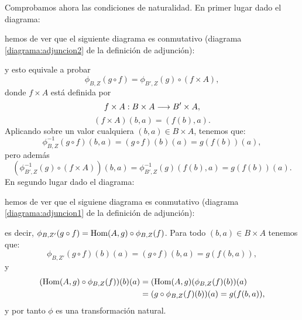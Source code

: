Comprobamos ahora las condiciones de naturalidad. En primer lugar dado
el diagrama:
\begin{center}
\end{center}
hemos de ver que el siguiente diagrama es conmutativo (diagrama
\eqref{diagrama:adjuncion2} de la definición de adjunción):
\begin{center}
\end{center}
y esto equivale a probar
$$\phi_{B,  Z}(g \circ f) = \phi_{B', Z}(g) \circ (f\times A),$$
donde $f \times A$ está definida por
$$f\times A: B\times A\longrightarrow B'\times A,$$
$$(f\times A)(b, a) = (f(b), a).$$
Aplicando sobre un valor cualquiera
$(b, a) \in B\times A$, tenemos que:
$$\phi_{B, Z}^{-1}(g \circ f)(b, a) = (g\circ f)(b)(a) = g(f(b))(a),$$
pero además
$$(\phi_{B', Z}^{-1}(g) \circ (f\times A))(b, a) =
   \phi_{B', Z}^{-1}(g)(f(b), a) = g(f(b))(a).$$
En segundo lugar dado el diagrama:
\begin{center}
\end{center}
hemos de ver que el siguiene diagrama es conmutativo
(diagrama \eqref{diagrama:adjuncion1} de la definición de adjunción):
\begin{center}
\end{center}
es decir, $\phi_{B, Z'}(g \circ f) = \operatorname{Hom}(A, g) \circ \phi_{B, Z}(f)$. Para
todo
$(b, a) \in B\times A$ tenemos que:
$$\phi_{B, Z'}(g \circ f)(b)(a) = (g\circ f)(b, a) = g(f(b, a)),$$
y
\begin{align*}
(\operatorname{Hom}(A, g)\circ\phi_{B, Z}(f))(b)(a) & = (\operatorname{Hom}(A, g)(\phi_{B, Z}(f)(b))(a)\\
  & = (g \circ \phi_{B,Z}(f)(b))(a) = g(f(b, a)),
\end{align*}
y por tanto $\phi$ es una transformación natural.

